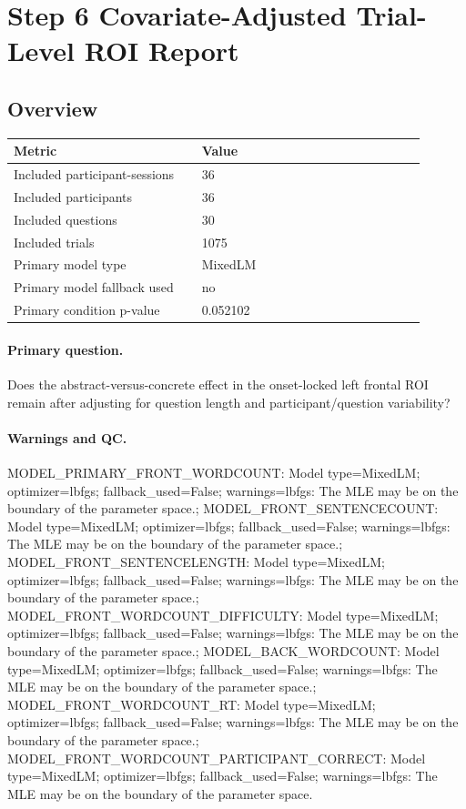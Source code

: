 \documentclass[11pt]{article}
\begin{document}
\section*{Step 6 Covariate-Adjusted Trial-Level ROI Report}
\subsection*{Overview}
\begin{tabular}{p{0.42\linewidth}p{0.50\linewidth}}
\toprule
Metric & Value\\
\midrule
Included participant-sessions & 36\\
Included participants & 36\\
Included questions & 30\\
Included trials & 1075\\
Primary model type & MixedLM\\
Primary model fallback used & no\\
Primary condition p-value & 0.052102\\
\bottomrule
\end{tabular}
\paragraph{Primary question.} Does the abstract-versus-concrete effect in the onset-locked left frontal ROI remain after adjusting for question length and participant/question variability?
\paragraph{Warnings and QC.} MODEL\_PRIMARY\_FRONT\_WORDCOUNT: Model type=MixedLM; optimizer=lbfgs; fallback\_used=False; warnings=lbfgs: The MLE may be on the boundary of the parameter space.; MODEL\_FRONT\_SENTENCECOUNT: Model type=MixedLM; optimizer=lbfgs; fallback\_used=False; warnings=lbfgs: The MLE may be on the boundary of the parameter space.; MODEL\_FRONT\_SENTENCELENGTH: Model type=MixedLM; optimizer=lbfgs; fallback\_used=False; warnings=lbfgs: The MLE may be on the boundary of the parameter space.; MODEL\_FRONT\_WORDCOUNT\_DIFFICULTY: Model type=MixedLM; optimizer=lbfgs; fallback\_used=False; warnings=lbfgs: The MLE may be on the boundary of the parameter space.; MODEL\_BACK\_WORDCOUNT: Model type=MixedLM; optimizer=lbfgs; fallback\_used=False; warnings=lbfgs: The MLE may be on the boundary of the parameter space.; MODEL\_FRONT\_WORDCOUNT\_RT: Model type=MixedLM; optimizer=lbfgs; fallback\_used=False; warnings=lbfgs: The MLE may be on the boundary of the parameter space.; MODEL\_FRONT\_WORDCOUNT\_PARTICIPANT\_CORRECT: Model type=MixedLM; optimizer=lbfgs; fallback\_used=False; warnings=lbfgs: The MLE may be on the boundary of the parameter space.
\end{document}
